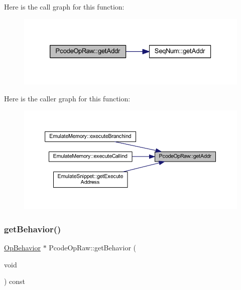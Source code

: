 Here is the call graph for this function\+:
\nopagebreak
\begin{figure}[H]
\begin{center}
\leavevmode
\includegraphics[width=326pt]{class_pcode_op_raw_ad6fbe5fdf363a5f46361910de067cc96_cgraph}
\end{center}
\end{figure}
Here is the caller graph for this function\+:
\nopagebreak
\begin{figure}[H]
\begin{center}
\leavevmode
\includegraphics[width=350pt]{class_pcode_op_raw_ad6fbe5fdf363a5f46361910de067cc96_icgraph}
\end{center}
\end{figure}
\mbox{\label{class_pcode_op_raw_ac790c26c33b84b492ce1146dfc813c8d}} 
\subsubsection{\texorpdfstring{getBehavior()}{getBehavior()}}
{\footnotesize\ttfamily \mbox{\hyperlink{class_op_behavior}{Op\+Behavior}} $\ast$ Pcode\+Op\+Raw\+::get\+Behavior (\begin{DoxyParamCaption}\item[{void}]{ }\end{DoxyParamCaption}) const\hspace{0.3cm}{\ttfamily [inline]}}



